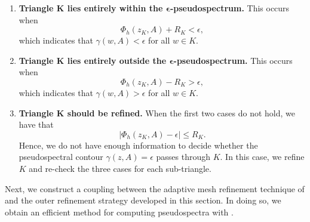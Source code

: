 \begin{enumerate}[label=\textbf{\arabic*}.] 

\item \textbf{Triangle $\boldsymbol{K}$ lies entirely within the $\boldsymbol{\epsilon}$-pseudospectrum.}
This occurs when
\begin{equation}\label{case 1}
    \Phi_h(z_K,A) + R_K < \epsilon,
\end{equation}
which indicates that $\gamma(w,A) < \epsilon$ for all $w \in K$.

\item \textbf{Triangle $\boldsymbol{K}$ lies entirely outside the $\boldsymbol{\epsilon}$-pseudospectrum.} This occurs when
\begin{equation}\label{case 2}
    \Phi_h(z_K,A) - R_K > \epsilon,
\end{equation}
which indicates that $\gamma(w,A) > \epsilon$ for all $w \in K$.
    

\item \textbf{Triangle $\boldsymbol{K}$ should be refined.}
When the first two cases do not hold, we have that
\begin{equation}\label{case 3}
    |\Phi_h(z_K,A) - \epsilon| \le R_K.
\end{equation}
Hence, we do not have enough information to decide whether the pseudospectral contour $\gamma(z, A) = \epsilon$ passes through $K.$ In this case, we refine $K$ and re-check the three cases for each sub-triangle.  
\end{enumerate}

Next, we construct a coupling between the adaptive mesh refinement technique of  and the outer refinement strategy developed in this section. In doing so, we obtain an efficient method for computing pseudospectra with . 

